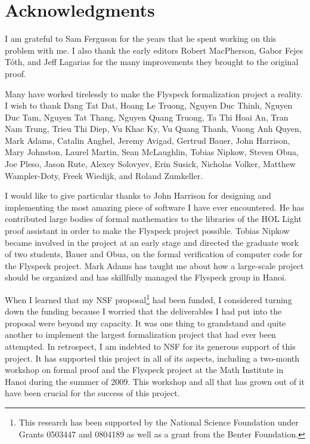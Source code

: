 

\section*{Acknowledgments}


I am grateful to Sam Ferguson for the years that he spent working on
this problem with me.  I also thank the early editors Robert
MacPherson, Gabor Fejes T\'oth, and Jeff Lagarias for the many
improvements they brought to the original proof.

Many have worked tirelessly to make the Flyspeck formalization project
a reality.  I wish to thank 
Dang Tat Dat, 
Hoang Le Truong,
Nguyen Duc Thinh,  
Nguyen Duc Tam, 
Nguyen Tat Thang,
Nguyen Quang Truong, 
Ta Thi Hoai An, 
Tran Nam Trung, 
Trieu Thi Diep, 
Vu Khac Ky, 
Vu Quang Thanh,
Vuong Anh Quyen,
% 
Mark Adams,
Catalin Anghel, 
Jeremy Avigad, 
Gertrud Bauer, 
%
John Harrison, 
Mary Johnston, 
Laurel %
Martin, 
Sean McLaughlin, 
Tobias Nipkow, 
Steven Obua, 
Joe Pleso, 
%
Jason Rute,
Alexey Solovyev,
Erin Susick,
Nicholas Volker, 
Matthew Wampler-Doty, 
 Freek Wiedijk, 
and Roland Zumkeller.

I would like to give particular thanks 
to John Harrison for designing and implementing the
most amazing piece of software I have ever encountered.  He has
contributed large bodies of formal mathematics to the libraries of the
HOL Light proof assistant in order to make the Flyspeck project
possible.  Tobias Nipkow became involved in the project at an early
stage and directed the graduate work of two students, Bauer and Obua,
on the formal verification of computer code for the Flyspeck
project. Mark Adams has taught me about how a large-scale project should
be organized and has skillfully managed the Flyspeck group in Hanoi.

When I learned that my NSF proposal\footnote{This research has been 
supported by the National Science Foundation
under Grants 0503447 and 0804189 as well as a grant from the Benter
Foundation.}
had been funded, I considered
turning down the funding because I worried that the deliverables I had
put into the proposal were beyond my capacity.  It was one thing to
grandstand and quite another to implement the largest formalization
project that had ever been attempted.  In retrospect, I am indebted to
NSF for its generous support of this project.  It has supported this
project in all of its aspects, including a two-month workshop on
formal proof and the Flyspeck project at the Math Institute in Hanoi
during the summer of 2009.  This workshop and all that has grown out
of it have been crucial for the success of this project.

